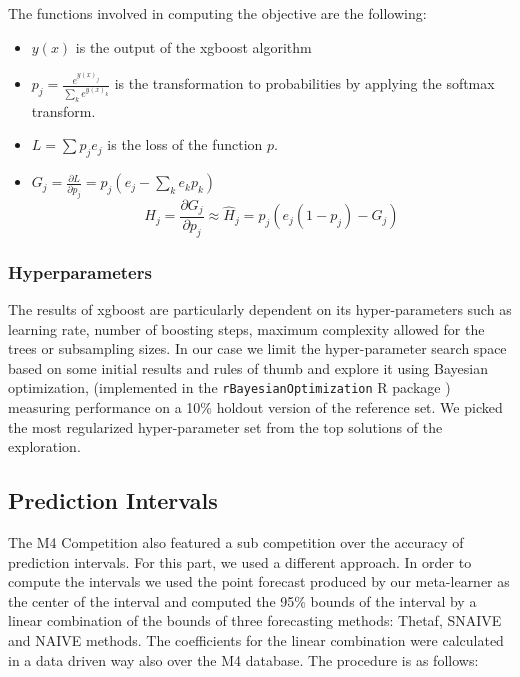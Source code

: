 \documentclass[11pt,a4paper,]{article}
\providecommand{\tightlist}{%
  \setlength{\itemsep}{0pt}\setlength{\parskip}{0pt}}
\theoremstyle{definition}
\theoremstyle{definition}
\theoremstyle{definition}
\theoremstyle{remark}
\begin{document}
The functions involved in computing the objective are the following:

\begin{itemize}
\tightlist
\item
  \(y(x)\) is the output of the xgboost algorithm
\item
  \(p_j = \frac{e^{y(x)_j}}{ \sum_k e^{y(x)_k}}\) is the transformation
  to probabilities by applying the softmax transform.
\item
  \(L = \sum p_j e_j\) is the loss of the function \(p\).
\item
  \(G_j = \frac{\partial{L}}{\partial{p_j}} = p_j(e_j -\sum_k e_kp_k)\)
  \[ H_j = \frac{\partial{G_j}}{\partial{p_j}} \approx \hat{H}_j = p_j(e_j(1-p_j) - G_j)  \]
\end{itemize}

\subsubsection{Hyperparameters}\label{hyperparameters}

The results of xgboost are particularly dependent on its
hyper-parameters such as learning rate, number of boosting steps,
maximum complexity allowed for the trees or subsampling sizes. In our
case we limit the hyper-parameter search space based on some initial
results and rules of thumb and explore it using Bayesian optimization,
(implemented in the \texttt{rBayesianOptimization} R package
\autocite{rBayesianOptimization}) measuring performance on a 10\%
holdout version of the reference set. We picked the most regularized
hyper-parameter set from the top solutions of the exploration.

\subsection{Prediction Intervals}\label{prediction-intervals}

The M4 Competition also featured a sub competition over the accuracy of
prediction intervals. For this part, we used a different approach. In
order to compute the intervals we used the point forecast produced by
our meta-learner as the center of the interval and computed the 95\%
bounds of the interval by a linear combination of the bounds of three
forecasting methods: Thetaf, SNAIVE and NAIVE methods. The coefficients
for the linear combination were calculated in a data driven way also
over the M4 database. The procedure is as follows:
\end{document}
